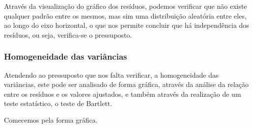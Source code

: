 \documentclass[]{article}
\begin{document}
Através da visualização do gráfico dos resíduos, podemos verificar que
não existe qualquer padrão entre os mesmos, mas sim uma distribuição
aleatória entre eles, ao longo do eixo horizontal, o que nos permite
concluir que há independência dos resíduos, ou seja, verifica-se o
pressuposto.

\subsubsection{Homogeneidade das variâncias}

Atendendo ao pressuposto que nos falta verificar, a homogeneidade das
variâncias, este pode ser analisado de forma gráfica, através da análise
da relação entre os resíduos e os valores ajustados, e também através da
realização de um teste estatístico, o teste de Bartlett.

Comecemos pela forma gráfica.

\begin{Shaded}
\begin{Highlighting}[]
\NormalTok{(} \NormalTok{(}\NormalTok{, }\NormalTok{))}

\NormalTok{(} \NormalTok{, } \NormalTok{)}
\NormalTok{(}\NormalTok{(}\SpecialCharTok{\textasciitilde{}}  \NormalTok{)}

\OtherTok{\textless{}{-}} \NormalTok{(}\NormalTok{(}
\NormalTok{(} \NormalTok{, } \NormalTok{)}
\NormalTok{(}\SpecialCharTok{\textasciitilde{}}  \NormalTok{)}
\end{Highlighting}
\end{Shaded}
\end{document}
